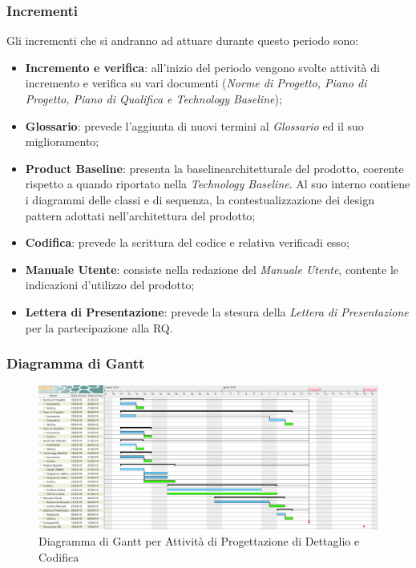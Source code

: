 \subsubsection{Incrementi}
Gli incrementi che si andranno ad attuare durante questo periodo sono:
\begin{itemize}
	\item \textbf{Incremento e verifica}: all'inizio del periodo vengono svolte attività di incremento e verifica su vari documenti (\textit{Norme di Progetto, Piano di Progetto, Piano di Qualifica e Technology Baseline});
	\item \textbf{Glossario}: prevede l'aggiunta di nuovi termini al \textit{Glossario} ed il suo miglioramento;
	\item \textbf{Product Baseline}\glossario: presenta la baseline\glossario architetturale del prodotto, coerente rispetto a quando riportato nella \textit{Technology Baseline}. Al suo interno contiene i diagrammi delle classi e di sequenza, la contestualizzazione dei design pattern adottati nell'architettura del prodotto; 
	\item \textbf{Codifica}: prevede la scrittura del codice e relativa verifica\glossario di esso;
	\item \textbf{Manuale Utente}: consiste nella redazione del \textit{Manuale Utente}, contente le indicazioni d'utilizzo del prodotto;
	\item \textbf{Lettera di Presentazione}: prevede la stesura della \textit{Lettera di Presentazione} per la partecipazione alla RQ.
\end{itemize}


\begin{landscape}
\subsubsection{Diagramma di Gantt}
\begin{figure}[h]
	\centering
  		\includegraphics[width=1.0\linewidth]{./images/DettaglioeCodifica.png}
  		\caption{Diagramma di Gantt per Attività di Progettazione di Dettaglio e Codifica}
  		\label{fig:Gantt Progettazione di dettaglio e codifica}
\end{figure}
\end{landscape}

